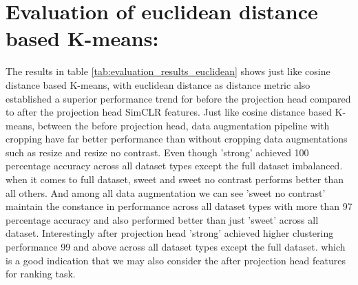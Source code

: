 \section{Evaluation of euclidean distance based K-means:}
The results in table \ref{tab:evaluation_results_euclidean} shows just like  cosine distance based K-means, with euclidean distance as distance metric also established a superior performance trend for before the projection head compared to after the projection head SimCLR features. Just like  cosine distance based K-means, between the before projection head, data augmentation pipeline with cropping have far better performance than without cropping data augmentations such as resize and resize no contrast. Even though 'strong' achieved 100 percentage accuracy across all dataset types except the full dataset imbalanced. when it comes to full dataset, sweet and sweet no contrast performs better than all others. And among all data augmentation we can see 'sweet no contrast' maintain the constance in performance across all dataset types with more than 97 percentage accuracy and also performed better than just 'sweet' across all dataset. Interestingly after projection head  'strong' achieved higher clustering performance 99 and above across all dataset types except the full dataset. which is a good indication that we may also consider the after projection head features for ranking task.
\begin{table}[H]
    \centering
    \caption{Evaluation Results on Different Datasets and Augmentations with Euclidean Distance}
    \label{tab:evaluation_results_euclidean}
\end{table}

